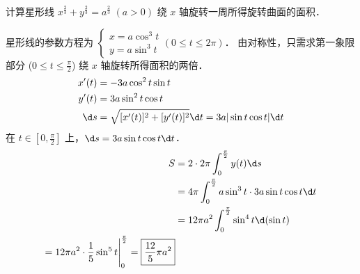 \documentclass[12pt, a4paper, oneside, UTF8]{ctexbook}
\begin{document}
\begin{example}
    计算星形线 $x^{\frac{2}{3}} + y^{\frac{2}{3}} = a^{\frac{2}{3}}\;(a>0)$ 绕 $x$ 轴旋转一周所得旋转曲面的面积．
\end{example}
\begin{solution}
    星形线的参数方程为 $\begin{cases} x=a\cos^3 t \\ y=a\sin^3 t \end{cases} (0 \le t \le 2\pi)$．
    由对称性，只需求第一象限部分 ($0 \le t \le \frac{\pi}{2}$) 绕 $x$ 轴旋转所得面积的两倍．
    \begin{align*}
        x'(t) &= -3a\cos^2 t \sin t \\
        y'(t) &= 3a\sin^2 t \cos t \\
        \d s &= \sqrt{[x'(t)]^2+[y'(t)]^2} \d t = 3a |\sin t \cos t| \d t
    \end{align*}
    在 $t \in [0, \frac{\pi}{2}]$ 上，$\d s = 3a \sin t \cos t \d t$．
    \begin{align*}
        S &= 2 \cdot 2\pi \int_{0}^{\frac{\pi}{2}} y(t) \d s \\
        &= 4\pi \int_{0}^{\frac{\pi}{2}} a\sin^3 t \cdot 3a \sin t \cos t \d t \\
        &= 12\pi a^2 \int_{0}^{\frac{\pi}{2}} \sin^4 t \d (\sin t) \\
        = 12\pi a^2 \cdot \dfrac{1}{5} \sin^5 t \Bigg|_{0}^{\frac{\pi}{2}} = \boxed{\dfrac{12}{5}\pi a^2}
    \end{align*}
\end{solution}
\end{document}
